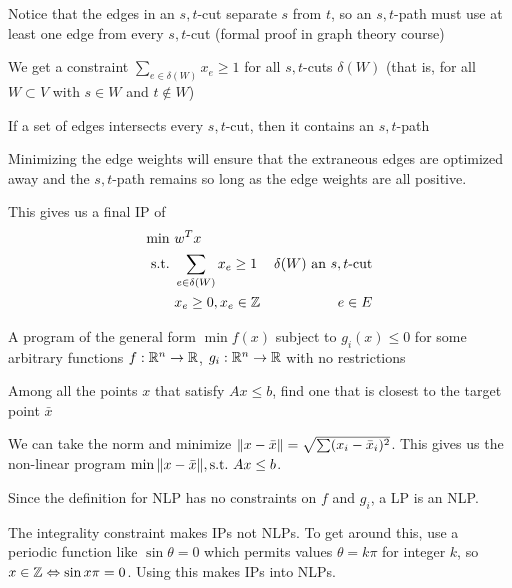 \documentclass[class=co250,tikz,notes]{agony}
\begin{document}
\begin{prop}
  Notice that the edges in an $s,t$-cut separate $s$ from $t$, so an $s,t$-path must use at least one edge from every $s,t$-cut (formal proof in graph theory course)
\end{prop}

We get a constraint $\sum_{e \in \delta(W)} x_e \geq 1$ for all $s,t$-cuts $\delta(W)$ (that is, for all $W \subset V$ with $s \in W$ and $t\not\in W$)

\begin{prop}
  If a set of edges intersects every $s,t$-cut, then it contains an $s,t$-path
\end{prop}

Minimizing the edge weights will ensure that the extraneous edges are optimized away and the $s,t$-path remains so long as the edge weights are all positive.

This gives us a final IP of
\begin{align*}
  \min\         & w^T x                                                               \\
  \text{s.t.}\  & \sum_{e \in \delta(W)} x_e \geq 1 & \text{$\delta(W)$ an $s,t$-cut} \\
                & x_e \geq 0, x_e \in \mathbb{Z}            & e \in E
\end{align*}

\begin{defn}
  A program of the general form $\min f(x)$ subject to $g_i(x) \leq 0$ for some arbitrary functions $f : \mathbb{R}^n \to \mathbb{R}$, $g_i : \mathbb{R}^n \to \mathbb{R}$ with no restrictions
\end{defn}
\begin{example}
  Among all the points $x$ that satisfy $Ax \leq b$, find one that is closest to the target point $\bar x$
\end{example}
\begin{sol}
  We can take the norm and minimize $\norm{x - \bar x} = \sqrt{\sum(x_i-\bar x_i)^2}$.
  This gives us the non-linear program $\min \norm{x - \bar x}, \text{s.t.\ } Ax \leq b$.
\end{sol}

Since the definition for NLP has no constraints on $f$ and $g_i$, a LP is an NLP.

The integrality constraint makes IPs not NLPs.
To get around this, use a periodic function like $\sin \theta = 0$ which permits values $\theta = k\pi$ for integer $k$, so $x \in \mathbb{Z} \Leftrightarrow \sin x\pi  = 0$.
Using this makes IPs into NLPs.
\end{document}
